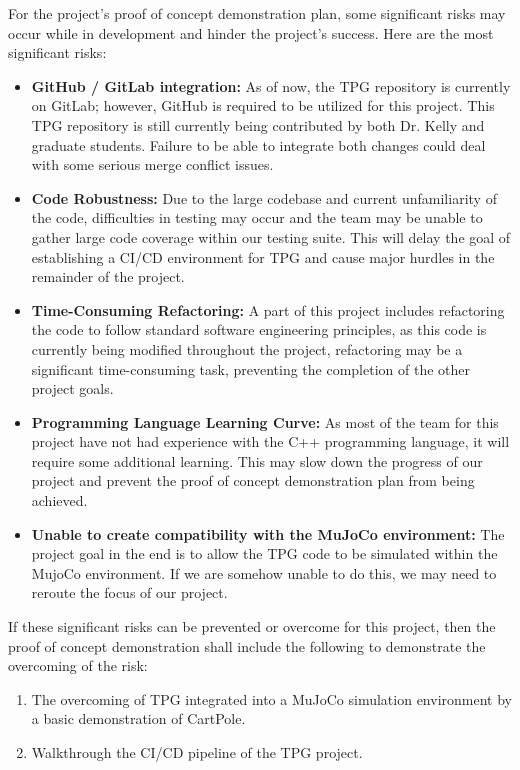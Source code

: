 \documentclass{article}
\begin{document}

For the project's proof of concept demonstration plan, some significant risks may occur while in development and hinder the project's success. Here are the most significant risks:
\begin{itemize}
  \item \textbf{GitHub / GitLab integration:} As of now, the TPG repository is currently on GitLab; however, GitHub is required to be utilized for this project. This TPG repository is still currently being contributed by both Dr. Kelly and graduate students. Failure to be able to integrate both changes could deal with some serious merge conflict issues.
  \item \textbf{Code Robustness:} Due to the large codebase and current unfamiliarity of the code, difficulties in testing may occur and the team may be unable to gather large code coverage within our testing suite. This will delay the goal of establishing a CI/CD environment for TPG and cause major hurdles in the remainder of the project.
  \item \textbf{Time-Consuming Refactoring:} A part of this project includes refactoring the code to follow standard software engineering principles, as this code is currently being modified throughout the project, refactoring may be a significant time-consuming task, preventing the completion of the other project goals.
  \item \textbf{Programming Language Learning Curve:} As most of the team for this project have not had experience with the C++ programming language, it will require some additional learning. This may slow down the progress of our project and prevent the proof of concept demonstration plan from being achieved.
  \item \textbf{Unable to create compatibility with the MuJoCo environment:} The project goal in the end is to allow the TPG code to be simulated within the MujoCo environment. If we are somehow unable to do this, we may need to reroute the focus of our project.
\end{itemize}


\noindent If these significant risks can be prevented or overcome for this project, then the proof of concept demonstration shall include the following to demonstrate the overcoming of the risk: 
\begin{enumerate}
 \item The overcoming of TPG integrated into a MuJoCo simulation environment by a basic demonstration of CartPole. 
 \item Walkthrough the CI/CD pipeline of the TPG project. 
\end{enumerate}
\end{document}
